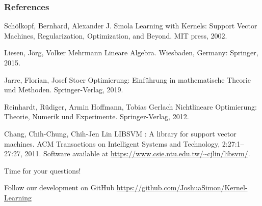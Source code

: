 \documentclass{beamer}
\begin{document}
\begin{frame}
\frametitle{References}
\footnotesize{
\begin{thebibliography}{99} %
     Schölkopf, Bernhard, Alexander J. Smola
    \newblock Learning with Kernels: Support Vector Machines, Regularization, Optimization, and Beyond. MIT press, 2002.

     Liesen, Jörg, Volker Mehrmann
    \newblock Lineare Algebra. Wiesbaden, Germany: Springer, 2015.

     Jarre, Florian, Josef Stoer
    \newblock Optimierung: Einführung in mathematische Theorie und Methoden. Springer-Verlag, 2019.

     Reinhardt, Rüdiger, Armin Hoffmann, Tobias Gerlach
    \newblock Nichtlineare Optimierung: Theorie, Numerik und Experimente. Springer-Verlag, 2012.

     Chang, Chih-Chung, Chih-Jen Lin
    \newblock LIBSVM : A library for support vector machines. ACM Transactions on Intelligent Systems and Technology, 2:27:1--27:27, 2011. Software available at \url{https://www.csie.ntu.edu.tw/~cjlin/libsvm/}.

\end{thebibliography}
}
\end{frame}


\begin{frame}
    \Huge{\centerline{Time for your questions!}}
    \bigskip
    \bigskip
    \bigskip
    \bigskip

    \normalsize
    Follow our development on GitHub  
    \url{https://github.com/JoshuaSimon/Kernel-Learning}
    
\end{frame}

\end{document}
